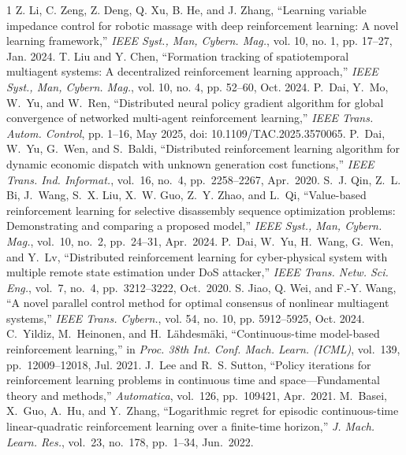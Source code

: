 \documentclass[onecolumn, journal]{IEEEtran} %
\begin{document}
	
	\begin{thebibliography}{1}
		Z. Li, C. Zeng, Z. Deng, Q. Xu, B. He, and J. Zhang, ``Learning variable impedance control for robotic massage with deep reinforcement learning: A novel learning framework,'' \textit{IEEE Syst., Man, Cybern. Mag.}, vol. 10, no. 1, pp. 17--27, Jan. 2024.
		T. Liu and Y. Chen, ``Formation tracking of spatiotemporal multiagent systems: A decentralized reinforcement learning approach,'' \textit{IEEE Syst., Man, Cybern. Mag.}, vol. 10, no. 4, pp. 52--60, Oct. 2024.
		P.~Dai, Y.~Mo, W.~Yu, and W.~Ren, ``Distributed neural policy gradient algorithm for global convergence of networked multi-agent reinforcement learning,'' \textit{IEEE Trans. Autom. Control}, pp. 1--16, May 2025, doi: 10.1109/TAC.2025.3570065.
		P.~Dai, W.~Yu, G.~Wen, and S.~Baldi, ``Distributed reinforcement learning algorithm for dynamic economic dispatch with unknown generation cost functions,'' \textit{IEEE Trans. Ind. Informat.}, vol.~16, no.~4, pp.~2258--2267, Apr.~2020.
		S.~J. Qin, Z.~L. Bi, J.~Wang, S.~X. Liu, X.~W. Guo, Z.~Y. Zhao, and L.~Qi, ``Value-based reinforcement learning for selective disassembly sequence optimization problems: Demonstrating and comparing a proposed model,'' \textit{IEEE Syst., Man, Cybern. Mag.}, vol.~10, no.~2, pp.~24--31, Apr.~2024.
		P.~Dai, W.~Yu, H.~Wang, G.~Wen, and Y.~Lv, ``Distributed reinforcement learning for cyber-physical system with multiple remote state estimation under DoS attacker,'' \textit{IEEE Trans. Netw. Sci. Eng.}, vol.~7, no.~4, pp.~3212--3222, Oct.~2020.
		S. Jiao, Q. Wei, and F.-Y. Wang, ``A novel parallel control method for optimal consensus of nonlinear multiagent systems,'' \textit{IEEE Trans. Cybern.}, vol. 54, no. 10, pp. 5912--5925, Oct. 2024.
		C.~Yildiz, M.~Heinonen, and H.~L\"{a}hdesm\"{a}ki, ``Continuous-time model-based reinforcement learning,'' in \emph{Proc. 38th Int. Conf. Mach. Learn. (ICML)}, vol.~139, pp.~12009--12018, Jul. 2021.
		J.~Lee and R.~S. Sutton, ``Policy iterations for reinforcement learning problems in continuous time and space---Fundamental theory and methods,'' \textit{Automatica}, vol.~126, pp.~109421, Apr.~2021.
		M.~Basei, X.~Guo, A.~Hu, and Y.~Zhang, ``Logarithmic regret for episodic continuous-time linear-quadratic reinforcement learning over a finite-time horizon,'' \textit{J. Mach. Learn. Res.}, vol.~23, no.~178, pp.~1--34, Jun.~2022.

\end{thebibliography}
\end{document}

